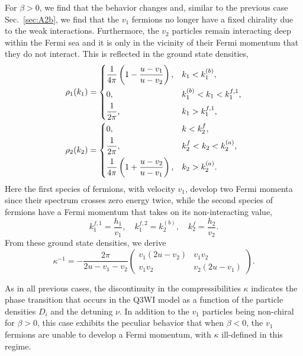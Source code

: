 \documentclass[aps,pra,
superscriptaddress,
reprint,twocolumn,preprintnumbers,
amsmath,amssymb,
nofootinbib]{revtex4-1}
\newcommand{\beq}{\begin{equation}}
\newcommand{\eeq}{\end{equation}}
\begin{document}
For $\beta>0$, we find that the behavior changes and, similar to the previous case Sec.~\ref{sec:A2b}, we find that the $v_1$ fermions no longer have a fixed chirality due to the weak interactions. Furthermore, the $v_2$ particles remain interacting deep within the Fermi sea and it is only in the vicinity of their Fermi momentum that they do not interact. This is reflected in the ground state densities, 
        \begin{align}
        &\rho_1(k_1) = 
        \begin{dcases}
        \frac{1}{4\pi} \left(1 - \frac{u - v_1}{u - v_2} \right), &k_1<k_1^{(b)}, \\
        0, &k_1^{(b)}<k_1<k_1^{f,1} ,\\
        \frac{1}{2\pi}, &k_1>k_1^{f,1},
        \end{dcases} \nonumber\\
        &\rho_2(k_2) = 
        \begin{dcases}
        0, &k<k_2^f,\\
        \frac{1}{2\pi}, &k_2^f<k_2<k_2^{(a)} ,\\
        \frac{1}{4\pi} \left(1 + \frac{u - v_2}{u - v_1} \right), &k_2>k_2^{(a)}.
        \end{dcases}
        \end{align}
Here the first species of fermions, with velocity $v_1$, develop two Fermi momenta since their spectrum crosses zero energy twice, while the second species of fermions have a Fermi momentum that takes on its non-interacting value,
\beq
k_1^{f,1} = \frac{h_1}{v_1},\quad k_1^{f,2} = k_2^{(b)},\quad k_2^f = \frac{h_2}{v_2}.
\eeq    
From these ground state densities, we derive 
        \begin{equation}
        \kappa^{-1} = -\frac{2 \pi}{2u - v_1 - v_2} \left(
        \begin{array}{cc}
        v_1 (2 u - v_2) & v_1 v_2\\
        v_1 v_2 & v_2 (2u - v_1)
        \end{array} \right).
        \end{equation}
        
As in all previous cases, the discontinuity in the compressibilities $\kappa$ indicates the phase transition that occurs in the Q3WI model as a function of the particle densities $D_i$ and the detuning $\nu$. In addition to the $v_1$ particles being non-chiral for $\beta>0$, this case exhibits the peculiar behavior that when $\beta < 0$, the $v_1$ fermions are unable to develop a Fermi momentum, with $\kappa$ ill-defined in this regime.          
        
\end{document}
